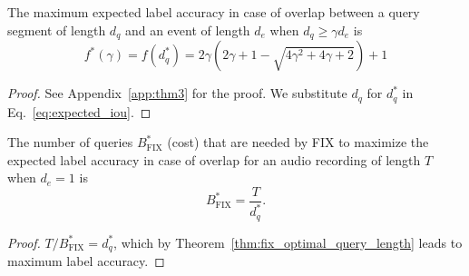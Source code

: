 
\begin{theorem}
\label{thm:max_iou}
The maximum expected label accuracy in case of overlap between a query segment of length $d_q$ and an event of length $d_e$ when $d_q \geq \gamma d_e$ is
\begin{equation}
    \label{eq:max_iou}
    f^*(\gamma) = f(d_q^*) = 2\gamma\left(2\gamma + 1 - \sqrt{4\gamma^2+4\gamma + 2} \right) + 1
\end{equation}
\end{theorem}
\begin{proof}
See Appendix~\ref{app:thm3} for the proof. We substitute $d_q$ for $d_q^*$ in Eq.~\ref{eq:expected_iou}.
\end{proof}


\begin{theorem}
\label{thm:fix_number_of_queries}
The number of queries $B^*_{\text{FIX}}$ (cost) that are needed by FIX to maximize the expected label accuracy in case of overlap for an audio recording of length $T$ when $d_e=1$ is 
\begin{equation}
\label{eq:b_fix_1}
    B^*_{\text{FIX}} = \frac{T}{d_q^*}.
\end{equation}
\end{theorem}
\begin{proof}
$T/B^*_{\text{FIX}} = d_q^*$, which by Theorem~\ref{thm:fix_optimal_query_length} leads to maximum label accuracy.
\end{proof}



